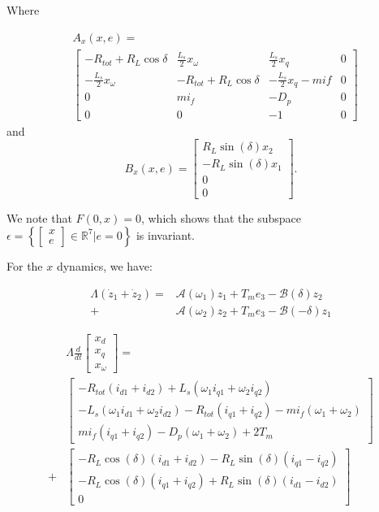 \documentclass[conference]{IEEEtran}
\begin{document}
Where 

$$
\begin{aligned}
&A_x\left(x,e\right)  = \\ & \left[\begin{array}{cccc}
-R_{tot}+R_{L}\cos\delta & \frac{L_{s}}{2}x_{\omega} & \frac{L_{s}}{2}x_{q} & 0\\
-\frac{L_{s}}{2}x_{\omega} & -R_{tot}+R_{L}\cos\delta & -\frac{L_{s}}{2}x_{q}-mif & 0\\
0 & mi_{f} & -D_{p} & 0\\
0 & 0 & -1 & 0
\end{array}\right]
\end{aligned}
$$ 
and
$$
B_x\left(x,e\right) = 
\left[\begin{array}{c}
R_{L}\sin(\delta)x_{2}\\
-R_{L}\sin(\delta)x_{1}\\
0\\
0
\end{array}\right].
$$



We note that $F(0,x)=0$, which shows that the subspace
$\epsilon=\left\{ \left[\begin{array}{c}
x\\
e
\end{array}\right]\in\mathbb{R}^{7}|e=0\right\} $ is invariant.

For the $x$ dynamics, we have:

$$
\begin{aligned}
\Lambda(\dot{z}_{1}+\dot{z}_{2})= & \mathcal{A}(\omega_{1})z_{1}+T_{m}e_{3}-\mathcal{B}(\delta)z_{2}\\+&\mathcal{A}(\omega_{2})z_{2}  +T_{m}e_{3}-\mathcal{B}(-\delta)z_{1}
\end{aligned}
$$

$$
\begin{aligned}
&\Lambda\frac{d}{dt}\left[\begin{array}{c}
x_{d}\\
x_{q}\\
x_{\omega}
\end{array}\right]  = \\
 & \left[\begin{array}{c}
-R_{tot}(i_{d1}+i_{d2})+L_{s}(\omega_{1}i_{q1}+\omega_{2}i_{q2})\\
-L_{s}(\omega_{1}i_{d1}+\omega_{2}i_{d2})-R_{tot}(i_{q1}+i_{q2})-mi_{f}(\omega_{1}+\omega_{2})\\
mi_{f}(i_{q1}+i_{q2})-D_{p}(\omega_{1}+\omega_{2})+2T_{m}
\end{array}\right]\\
 +& \left[\begin{array}{c}
-R_{L}\cos(\delta)(i_{d1}+i_{d2})-R_{L}\sin(\delta)(i_{q1}-i_{q2})\\
-R_{L}\cos(\delta)(i_{q1}+i_{q2})+R_{L}\sin(\delta)(i_{d1}-i_{d2})\\
0
\end{array}\right]
\end{aligned}
$$
\end{document}

